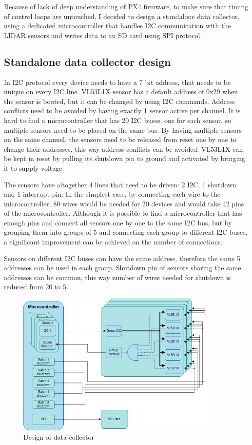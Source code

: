 Because of lack of deep understanding of PX4 firmware, to make sure that timing of control loops 
are untouched, I decided to design a standalone data collector, using a dedicated microcontroller that
handles I2C communication with the LIDAR sensors and writes data to an SD card using SPI protocol.

\subsection{Standalone data collector design}
In I2C protocol every device needs to have a 7 bit address, that needs to be unique on every
I2C line. VL53L1X sensor has a default address of 0x29 when the sensor is booted, but it can be changed
by using I2C commands. Address conflicts need to be avoided by having exactly 1 sensor active per channel.
It is hard to find a microcontroller that has 20 I2C buses, one for each sensor, so multiple sensors
need to be placed on the same bus. By having multiple sensors on the same channel, the sensors need to 
be released from reset one by one to change their addresses, this way address conflicts can be avoided.
VL53L1X can be kept in reset by pulling its shutdown pin to ground and activated by bringing it to 
supply voltage. 

The sensors have altogether 4 lines that need to be driven: 2 I2C, 1 shutdown and 1 interrupt pin.
In the simplest case, by connecting each wire to the microcontroller, 80 wires would be needed for 
20 devices and would take 42 pins of the microcontroller. Although it is possible to find a microcontroller 
that has enough pins and connect all sensors one by one to the same I2C bus, but by grouping them 
into groups of 5 and connecting each group to different I2C buses, a significant improvement can be 
achieved on the number of connections. 

Sensors on different I2C buses can have the same address, therefore the same 5 addresses can be used
in each group. Shutdown pin of sensors sharing the same addresses can be common, this way number of
wires needed for shutdown is reduced from 20 to 5.

\begin{figure}[ht]
    \centering
    \includegraphics[width=100mm, keepaspectratio]{figures/data_collector.png}
    \caption{Design of data collector}
    \label{fig:data_collector}
\end{figure}

